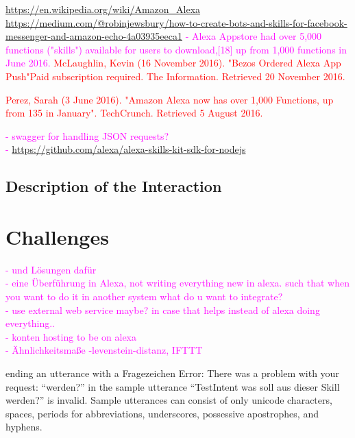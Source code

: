 \url{https://en.wikipedia.org/wiki/Amazon_Alexa}
\url{https://medium.com/@robinjewsbury/how-to-create-bots-and-skills-for-facebook-messenger-and-amazon-echo-4a03935eeca1}
\textcolor{magenta}{
- Alexa Appstore had over 5,000 functions ("skills") available for users to download,[18] up from 1,000 functions in June 2016.
}
\textcolor{red}{McLaughlin, Kevin (16 November 2016). "Bezos Ordered Alexa App Push"Paid subscription required. The Information. Retrieved 20 November 2016.}

\textcolor{red}{Perez, Sarah (3 June 2016). "Amazon Alexa now has over 1,000 Functions, up from 135 in January". TechCrunch. Retrieved 5 August 2016.}





\textcolor{magenta}{
- swagger for handling JSON requests?\\
- \url{https://github.com/alexa/alexa-skills-kit-sdk-for-nodejs}
}


\subsection*{Description of the Interaction}


\section{Challenges}

\textcolor{magenta}{
- und L\"osungen daf\"ur\\
- eine \"Uberf\"uhrung in Alexa, not writing everything new in alexa. such that when you want to do it in another system what do u want to integrate?\\
- use external web service maybe? in case that helps instead of alexa doing everything..\\
- konten hosting to be on alexa\\
- \"Ahnlichkeitsma{\ss}e -levenstein-distanz, IFTTT
}

ending an utterance with a Fragezeichen
Error: There was a problem with your request: ``werden?'' in the sample utterance ``TestIntent was soll aus dieser Skill werden?'' is invalid. Sample utterances can consist of only unicode characters, spaces, periods for abbreviations, underscores, possessive apostrophes, and hyphens.

